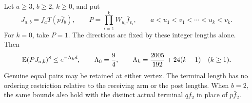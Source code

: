 \begin{proposition}
\label{prop:ordinary-unit-inner}
Let \(a\ge3\), \(b\ge2\), \(k\ge0\), and put
\[
 J_{a,b}=f_aT(p\bar f_b),\qquad
 P=\prod_{i=1}^kW_{u_i}\bar f_{v_i},\qquad
 a<u_1<v_1<\cdots<u_k<v_k.
\]
For \(k=0\), take \(P=1\). The directions are fixed by these integer lengths alone. Then
\begin{equation}\label{eq:ordinary-unit-inner:rates}
 \mathbb E(PJ_{a,b})^8\le e^{-\Lambda_kd},\qquad
 \Lambda_0=\frac94,\qquad
 \Lambda_k=\frac{2005}{192}+24(k-1)\quad(k\ge1).
\end{equation}
Genuine equal pairs may be retained at either vertex.
The terminal length has no ordering restriction relative to the
receiving arm or the post lengths.
When \(b=2\), the same bounds also hold with the distinct actual
terminal \(qf_2\) in place of \(p\bar f_2\).
\end{proposition}
